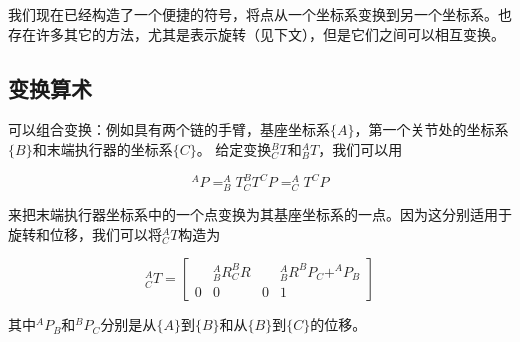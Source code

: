 
我们现在已经构造了一个便捷的符号，将点从一个坐标系变换到另一个坐标系。也存在许多其它的方法，尤其是表示旋转（见下文），但是它们之间可以相互变换。

\subsection{变换算术}

可以组合变换：例如具有两个链的手臂，基座坐标系$\{A\}$，第一个关节处的坐标系$\{B\}$和末端执行器的坐标系$\{C\}$。 给定变换$^B_CT$和$^A_BT$，我们可以用

\begin{equation}
^AP=^A_BT^B_CT^CP=^A_CT^CP
\end{equation}

来把末端执行器坐标系中的一个点变换为其基座坐标系的一点。因为这分别适用于旋转和位移，我们可以将$^A_CT$构造为

\begin{equation}
^A_CT=\left[\begin{array}{ccc|c} & ^A_BR^B_CR & & ^A_BR^BP_C +^AP_B \\\hline 0 & 0 & 0 & 1\end{array}\right]
\end{equation}
%

其中$^AP_B$和$^BP_C$分别是从$\{A\}$到$\{B\}$和从$\{B\}$到$\{C\}$的位移。

